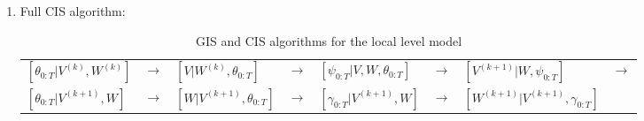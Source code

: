 \documentclass{article}
\begin{document}
\begin{table}[!h]
\begin{enumerate}
\begin{center}
\begin{tabular}{llllll}
      \end{tabular}
    \end{center}
  \item Full CIS algorithm:\\
    \begin{center}
      \begin{tabular}{llllllll}
        $[\theta_{0:T}|V^{(k)},W^{(k)}]$& $\to$& $[V|W^{(k)},\theta_{0:T}]$& $\to$& $[\psi_{0:T}|V,W,\theta_{0:T}]$& $\to$& $[V^{(k+1)}|W,\psi_{0:T}]$& $\to$\\ 
        $[\theta_{0:T}|V^{(k+1)},W]$& $\to$& $[W|V^{(k+1)},\theta_{0:T}]$& $\to$& $[\gamma_{0:T}|V^{(k+1)},W]$& $\to$& $[W^{(k+1)}|V^{(k+1)},\gamma_{0:T}]$&
    \end{tabular}
\end{center}
\end{enumerate}
\caption{GIS and CIS algorithms for the local level model}
\label{GISalgorithms}
\end{table}
\end{document}
